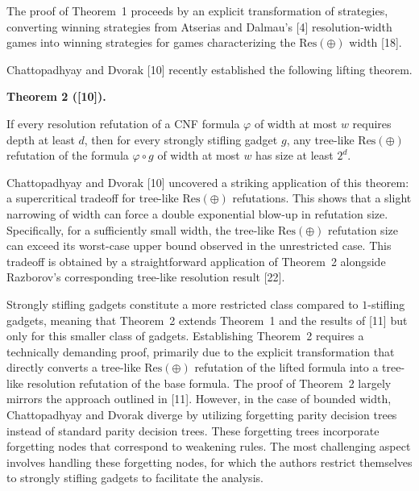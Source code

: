 The proof of Theorem 1 proceeds by an explicit transformation of strategies, converting winning strategies from Atserias and Dalmau’s [4] resolution-width games into winning strategies for games characterizing the $\mathrm{Res}(\oplus)$ width [18].\par



Chattopadhyay and Dvorak [10] recently established the following lifting theorem.\par



\par\medskip\noindent\textbf{
Theorem 2 ([10]).
}\par



If every resolution refutation of a CNF formula $\varphi$ of width at most $w$ requires depth at least $d$, then for every strongly stifling gadget $g$, any tree-like $\mathrm{Res}(\oplus)$ refutation of the formula
$\varphi\circ g$ of width at most $w$ has size at least $2^{d}$.\par




Chattopadhyay and Dvorak [10] uncovered a striking application of this theorem: a supercritical tradeoff for tree-like $\mathrm{Res}(\oplus)$ refutations. This shows that a slight narrowing of width can force a double exponential blow-up in refutation size. Specifically, for a sufficiently small width, the tree-like $\mathrm{Res}(\oplus)$ refutation size can exceed its worst-case upper bound observed in the unrestricted case. This tradeoff is obtained by a straightforward application of Theorem 2 alongside Razborov’s corresponding tree-like resolution result [22].\par



Strongly stifling gadgets constitute a more restricted class compared to $1$-stifling gadgets, meaning that Theorem 2 extends Theorem 1 and the results of [11] but only for this smaller class of gadgets. Establishing Theorem 2 requires a technically demanding proof, primarily due to the explicit transformation that directly converts a tree-like $\mathrm{Res}(\oplus)$ refutation of the lifted formula into a tree-like resolution refutation of the base formula. The proof of Theorem 2 largely mirrors the approach outlined in [11]. However, in the case of bounded width, Chattopadhyay and Dvorak diverge by utilizing forgetting parity decision trees instead of standard parity decision trees. These forgetting trees incorporate forgetting nodes that correspond to weakening rules. The most challenging aspect involves handling these forgetting nodes, for which the authors restrict themselves to strongly stifling gadgets to facilitate the analysis.\par


